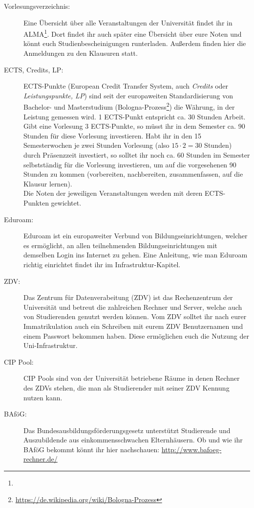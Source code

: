 \begin{description}
\item [Vorlesungsverzeichnis:] Eine Übersicht über alle Veranstaltungen der Universität findet ihr in ALMA\footnote{}. Dort findet ihr auch später eine Übersicht über eure Noten und könnt euch Studienbescheinigungen runterladen. Außerdem finden hier die Anmeldungen zu den Klausuren statt.	%

\item [ECTS, Credits, LP:] ECTS-Punkte (European Credit Transfer System, auch \textit{Credits} oder \textit{Leistungspunkte, LP}) sind seit der europaweiten Standardisierung von Bachelor- und Masterstudium (Bologna-Prozess\footnote{\url{https://de.wikipedia.org/wiki/Bologna-Prozess}}) die Währung, in der Leistung gemessen wird. 1 ECTS-Punkt entspricht ca. 30 Stunden Arbeit. Gibt eine Vorlesung 3 ECTS-Punkte, so müsst ihr in dem Semester ca. 90 Stunden für diese Vorlesung investieren. Habt ihr in den 15 Semesterwochen je zwei Stunden Vorlesung (also $15\cdot 2=30$ Stunden) durch Präsenzzeit investiert, so solltet ihr noch ca. 60 Stunden im Semester selbstständig für die Vorlesung investieren, um auf die vorgesehenen 90 Stunden zu kommen (vorbereiten, nachbereiten, zusammenfassen, auf die Klausur lernen).\\	%
Die Noten der jeweiligen Veranstaltungen werden mit deren ECTS-Punkten gewichtet.
 
\item [Eduroam:] Eduroam ist ein europaweiter Verbund von Bildungseinrichtungen, welcher es ermöglicht, an allen teilnehmenden Bildungseinrichtungen mit demselben Login ins Internet zu gehen.
Eine Anleitung, wie man Eduroam richtig einrichtet findet ihr im Infrastruktur-Kapitel.

\item [ZDV:] Das Zentrum für Datenverabeitung (ZDV) ist das Rechenzentrum der Universität und betreut die zahlreichen Rechner und Server, welche auch von Studierenden genutzt werden können. Vom ZDV solltet ihr nach eurer Immatrikulation auch ein Schreiben mit eurem ZDV Benutzernamen und einem Passwort bekommen haben. Diese ermöglichen euch die Nutzung der Uni-Infrastruktur.

\item [CIP Pool:] CIP Pools sind von der Universität betriebene Räume in denen Rechner des ZDVs stehen, die man als Studierender mit seiner ZDV Kennung nutzen kann.

\item[BAföG:] Das Bundesausbildungsförderungsgesetz unterstützt Studierende und Auszubildende aus einkommensschwachen Elternhäusern. Ob und wie ihr BAföG bekommt könnt ihr hier nachschauen: \url{http://www.bafoeg-rechner.de/}	%


\end{description}
